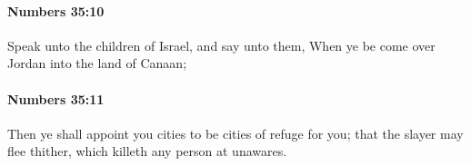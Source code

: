 		\paragraph{Numbers 35:10} %
			\label{NUMBERS-35-10}

			Speak unto the children of Israel, and say unto them, When ye be come over Jordan into the land of Canaan;


		\paragraph{Numbers 35:11} %
			\label{NUMBERS-35-11}

			Then ye shall appoint you cities to be cities of refuge for you; that the slayer may flee thither, which killeth any person at unawares.


